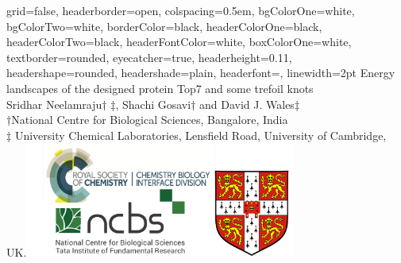 \documentclass[a0paper,portrait]{baposter}
\begin{document}
\begin{poster}
{
grid=false,
headerborder=open, %
colspacing=0.5em, %
bgColorOne=white, %
bgColorTwo=white, %
borderColor=black, %
headerColorOne=black, %
headerColorTwo=black, %
headerFontColor=white, %
boxColorOne=white, %
textborder=rounded, %
eyecatcher=true, %
headerheight=0.11\textheight, %
headershape=rounded, %
headershade=plain,
headerfont=\Large\textsf, %
linewidth=2pt %
}
{}
%
%
{
\textsf %
{Energy landscapes of the designed protein Top7 and some trefoil knots}
}
{\sf\\
Sridhar Neelamraju$\dagger$ $\ddagger$, Shachi Gosavi$\dagger$ and David J. Wales$\ddagger$\\
\small{$\dagger$National Centre for Biological Sciences, Bangalore, India\\ $\ddagger$ University Chemical Laboratories, Lensfield Road, University of Cambridge, UK.}}{\includegraphics[width=3.5in]{logo}}


\end{poster}
\end{document}
